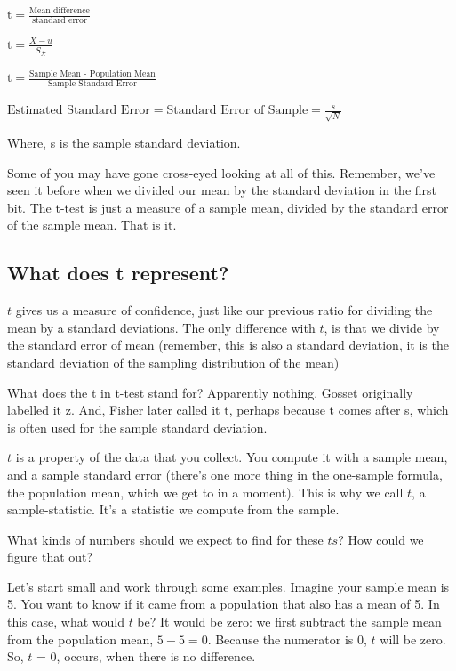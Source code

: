 \documentclass[]{book}
\newenvironment{marginnote}%
  {\itshape}%
  {}
\begin{document}
\(\text{t} = \frac{\text{Mean difference}}{\text{standard error}}\)

\(\text{t} = \frac{\bar{X}-u}{S_{\bar{X}}}\)

\(\text{t} = \frac{\text{Sample Mean  - Population Mean}}{\text{Sample Standard Error}}\)

\(\text{Estimated Standard Error} = \text{Standard Error of Sample} = \frac{s}{\sqrt{N}}\)

Where, s is the sample standard deviation.

Some of you may have gone cross-eyed looking at all of this. Remember, we've seen it before when we divided our mean by the standard deviation in the first bit. The t-test is just a measure of a sample mean, divided by the standard error of the sample mean. That is it.

\hypertarget{what-does-t-represent}{%
\subsection{What does t represent?}\label{what-does-t-represent}}

\(t\) gives us a measure of confidence, just like our previous ratio for dividing the mean by a standard deviations. The only difference with \(t\), is that we divide by the standard error of mean (remember, this is also a standard deviation, it is the standard deviation of the sampling distribution of the mean)

\begin{marginnote}

What does the t in t-test stand for? Apparently nothing. Gosset originally labelled it z. And, Fisher later called it t, perhaps because t comes after s, which is often used for the sample standard deviation.

\end{marginnote}

\(t\) is a property of the data that you collect. You compute it with a sample mean, and a sample standard error (there's one more thing in the one-sample formula, the population mean, which we get to in a moment). This is why we call \(t\), a sample-statistic. It's a statistic we compute from the sample.

What kinds of numbers should we expect to find for these \(ts\)? How could we figure that out?

Let's start small and work through some examples. Imagine your sample mean is 5. You want to know if it came from a population that also has a mean of 5. In this case, what would \(t\) be? It would be zero: we first subtract the sample mean from the population mean, \(5-5=0\). Because the numerator is 0, \(t\) will be zero. So, \(t\) = 0, occurs, when there is no difference.
\end{document}
